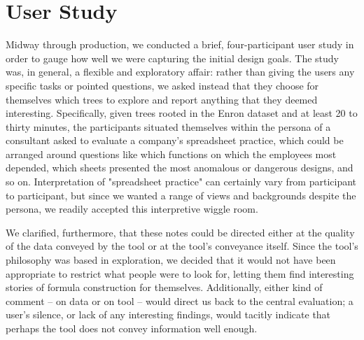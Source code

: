 \documentclass[conference]{IEEEtran}
\begin{document}
	\section{User Study} Midway through production, we conducted a brief,
	four-participant user study in order to gauge how well we were capturing the
	initial design goals. The study was, in general, a flexible and exploratory
	affair: rather than giving the users any specific tasks or pointed questions,
	we asked instead that they choose for themselves which trees to explore and
	report anything that they deemed interesting. Specifically, given trees rooted
	in the Enron dataset and at least 20 to thirty minutes, the participants
	situated themselves within the persona of a consultant asked to evaluate a
	company's spreadsheet practice, which could be arranged around questions like
	which functions on which the employees most depended, which sheets presented
	the most anomalous or dangerous designs, and so on. Interpretation of
	"spreadsheet practice" can certainly vary from participant to participant, but
	since we wanted a range of views and backgrounds despite the persona, we
	readily accepted this interpretive wiggle room. \par
	
	We clarified, furthermore, that these notes could be directed either at the
	quality of the data conveyed by the tool or at the tool's conveyance itself.
	Since the tool's philosophy was based in exploration, we decided that it would
	not have been appropriate to restrict what people were to look for, letting
	them find interesting stories of formula construction for themselves.
	Additionally, either kind of comment -- on data or on tool -- would direct us
	back to the central evaluation; a user's silence, or lack of any interesting
	findings, would tacitly indicate that perhaps the tool does not convey
	information well enough. \par
	
\end{document}
